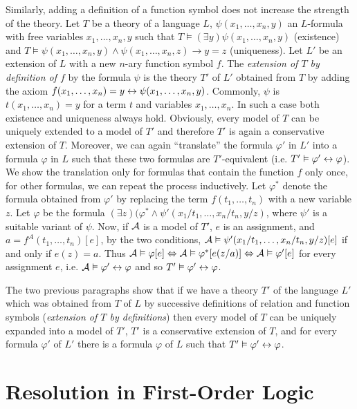 Similarly, adding a definition of a function symbol does not increase the strength of the theory. Let $T$ be a theory of a language $L$, $\psi(x_1, \dots, x_n, y)$ an $L$-formula with free variables $x_1, \dots, x_n, y$ such that $T \vDash (\exists y)\psi(x_1, \dots, x_n, y)$ (existence) and $T \vDash \psi(x_1, \dots, x_n, y) \land \psi(x_1, \dots, x_n, z) \to y = z$ (uniqueness).
Let $L'$ be an extension of $L$ with a new $n$-ary function symbol $f$. The \emph{extension of $T$ by definition of $f$} by the formula $\psi$ is the theory $T'$ of $L'$ obtained from $T$ by adding the axiom $f(x_1, \dots, x_n) = y \leftrightarrow \psi(x_1, \dots, x_n, y)$. Commonly, $\psi$ is $t(x_1, \dots, x_n) = y$ for a term $t$ and variables $x_1, \dots, x_n$. In such a case both existence and uniqueness always hold. Obviously, every model of $T$ can be uniquely extended to a model of $T'$ and therefore $T'$ is again a conservative extension of $T$. Moreover, we can again ``translate'' the formula $\varphi'$ in $L'$ into a formula $\varphi$ in $L$ such that these two formulas are $T'$-equivalent (i.e. $T' \vDash \varphi' \leftrightarrow \varphi$). We show the translation only for formulas that contain the function $f$ only once, for other formulas, we can repeat the process inductively. Let $\varphi^*$ denote the formula obtained from $\varphi'$ by replacing the term $f(t_1, \dots, t_n)$ with a new variable $z$. Let $\varphi$ be the formula $(\exists z)(\varphi^* \land \psi'(x_1/t_1, \dots, x_n/t_n, y/z)$, where $\psi'$ is a suitable variant of $\psi$. Now, if $\mathcal{A}$ is a model of $T'$, $e$ is an assignment, and $a = f^A(t_1, \dots, t_n)[e]$, by the two conditions, $\mathcal{A} \vDash \psi'(x_1/t_1, \dots, x_n/t_n, y/z)[e]$ if and only if $e(z) = a$. Thus $\mathcal{A} \vDash \varphi[e] \Leftrightarrow \mathcal{A} \vDash \varphi^*[e(z/a)] \Leftrightarrow \mathcal{A} \vDash \varphi'[e]$ for every assignment $e$, i.e. $\mathcal{A} \vDash \varphi' \leftrightarrow \varphi$ and so $T' \vDash \varphi' \leftrightarrow \varphi$.

The two previous paragraphs show that if we have a theory $T'$ of the language $L'$ which was obtained from $T$ of $L$ by successive definitions of relation and function symbols (\emph{extension of $T$ by definitions}) then every model of $T$ can be uniquely expanded into a model of $T'$, $T'$ is a conservative extension of $T$, and for every formula $\varphi'$ of $L'$ there is a formula $\varphi$ of $L$ such that $T' \vDash \varphi' \leftrightarrow \varphi$.

\chapter{Resolution in First-Order Logic}

